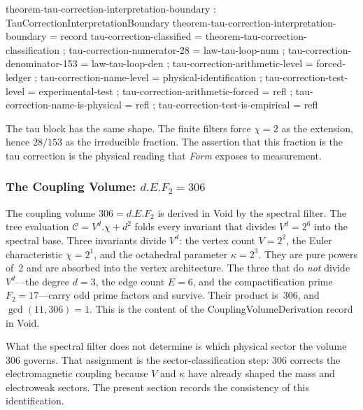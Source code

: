 \documentclass[11pt,a4paper]{book}
\def\cdot{.}%
\def\texttt#1{#1}%
\begin{document}
\begin{code}
theorem-tau-correction-interpretation-boundary : TauCorrectionInterpretationBoundary
theorem-tau-correction-interpretation-boundary = record
  { tau-correction-classified        = theorem-tau-correction-classification
  ; tau-correction-numerator-28      = law-tau-loop-num
  ; tau-correction-denominator-153   = law-tau-loop-den
  ; tau-correction-arithmetic-level  = forced-ledger
  ; tau-correction-name-level        = physical-identification
  ; tau-correction-test-level        = experimental-test
  ; tau-correction-arithmetic-forced = refl
  ; tau-correction-name-is-physical  = refl
  ; tau-correction-test-is-empirical = refl
  }
\end{code}

The tau block has the same shape.  The finite filters force
$\chi = 2$ as the extension, hence $28/153$ as the irreducible
fraction.  The assertion that this fraction is the tau correction is
the physical reading that \textit{Form} exposes to measurement.

\subsubsection*{The Coupling Volume: $d \cdot E \cdot F_2 = 306$}

The coupling volume $306 = d \cdot E \cdot F_2$ is derived in Void by
the spectral filter.  The tree evaluation $\mathcal{C} = V^d \cdot \chi
+ d^2$ folds every invariant that divides $V^d = 2^6$ into the spectral
base.  Three invariants divide $V^d$: the vertex count $V = 2^2$, the
Euler characteristic $\chi = 2^1$, and the octahedral parameter $\kappa
= 2^3$.  They are pure powers of~$2$ and are absorbed into the vertex
architecture.  The three that do \emph{not} divide~$V^d$---the degree
$d = 3$, the edge count $E = 6$, and the compactification prime $F_2 =
17$---carry odd prime factors and survive.  Their product is~$306$, and
$\gcd(11, 306) = 1$.  This is the content of the
\texttt{CouplingVolumeDerivation} record in Void.

What the spectral filter does not determine is which physical sector
the volume~$306$ governs.  That assignment is the sector-classification step:
$306$ corrects the electromagnetic coupling because $V$ and $\kappa$
have already shaped the mass and electroweak sectors.  The present
section records the consistency of this identification.
\end{document}
